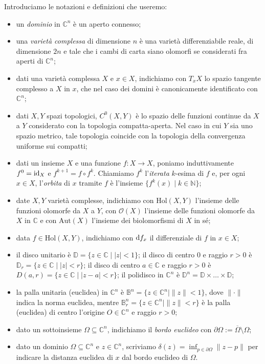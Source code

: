 Introduciamo le notazioni e definizioni che useremo:
\begin{itemize}
    \item  un \textit{dominio} in $\mathbb{C}^n$ è un aperto connesso;
    \item una \textit{varietà complessa} di dimensione $n$ è una varietà differenziabile reale, di dimensione $2n$ e tale che i cambi di carta siano olomorfi se considerati fra aperti di $\mathbb{C}^n$;
    \item dati una varietà complessa $X$ e $x \in X$, indichiamo con $T_xX$ lo spazio tangente complesso a $X$ in $x$, che nel caso dei domini è canonicamente identificato con $\mathbb{C}^n$;
    \item dati $X,Y$ spazi topologici, $C^0(X,Y)$ è lo spazio delle funzioni continue da $X$ a $Y$ considerato con la topologia compatta-aperta. Nel caso in cui $Y$ sia uno spazio metrico, tale topologia coincide con la topologia della convergenza uniforme sui compatti;
    \item dati un insieme $X$ e una funzione $f:X\longrightarrow X$, poniamo induttivamente $f^0=\operatorname{id}_X$ e $f^{k+1}=f\circ f^k$. Chiamiamo $f^k$ l'\textit{iterata} $k$-esima di $f$ e, per ogni $x \in X$, l'\textit{orbita} di $x$ tramite $f$ è l'insieme $\{f^k(x)\mid k \in \mathbb{N}\}$;
    \item date $X,Y$ varietà complesse, indichiamo con $\text{Hol}(X,Y)$ l'insieme delle funzioni olomorfe da $X$ a $Y$, con $\mathcal{O}(X)$ l'insieme delle funzioni olomorfe da $X$ in $\mathbb{C}$ e con $\text{Aut}(X)$ l'insieme dei biolomorfismi di $X$ in sé;
    \item data $f \in \text{Hol}(X,Y)$, indichiamo con $\mathop{}\!\mathrm{d} f_x$ il differenziale di $f$ in $x \in X$;
    \item il disco unitario è $\mathbb{D}=\{z \in \mathbb{C} \mid |z|<1\}$; il disco di centro $0$ e raggio $r>0$ è $\mathbb{D}_r=\{z \in \mathbb{C} \mid |z|<r\}$; il disco di centro $a\in\mathbb{C}$ e raggio $r>0$ è $D(a,r)=\{z\in\mathbb{C}\mid |z-a|<r\}$; il polidisco in $\mathbb{C}^n$ è $\mathbb{D}^n=\mathbb{D}\times\dots\times\mathbb{D}$;
    \item la palla unitaria (euclidea) in $\mathbb{C}^n$ è $\mathbb{B}^n=\{z \in \mathbb{C}^n \mid \|z\|<1\}$, dove $\|\cdot\|$ indica la norma euclidea, mentre $\mathbb{B}_r^n=\{z \in \mathbb{C}^n \mid \|z\|<r\}$ è la palla (euclidea) di centro l'origine $O\in\mathbb{C}^n$ e raggio $r>0$;
    \item dato un sottoinsieme $\Omega\subseteq \mathbb{C}^n$, indichiamo il \textit{bordo euclideo} con $\partial\Omega:=\overline{\Omega}\setminus\Omega$;
    \item dato un dominio $\Omega\subseteq\mathbb{C}^n$ e $z \in \mathbb{C}^n$, scriviamo $\delta(z)=\displaystyle\inf_{p \in \partial\Omega}\|z-p\|$ per indicare la distanza euclidea di $x$ dal bordo euclideo di $\Omega$.
\end{itemize}

